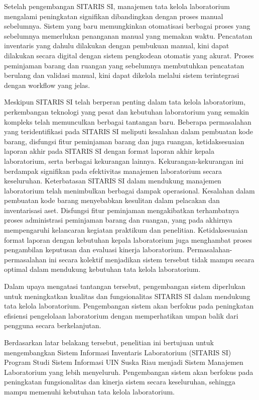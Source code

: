 Setelah pengembangan SITARIS SI, manajemen tata kelola laboratorium mengalami peningkatan signifikan dibandingkan dengan proses manual sebelumnya. Sistem yang baru memungkinkan otomatisasi berbagai proses yang sebelumnya memerlukan penanganan manual yang memakan waktu. Pencatatan inventaris yang dahulu dilakukan dengan pembukuan manual, kini dapat dilakukan secara digital dengan sistem pengkodean otomatis yang akurat. Proses peminjaman barang dan ruangan yang sebelumnya membutuhkan pencatatan berulang dan validasi manual, kini dapat dikelola melalui sistem terintegrasi dengan workflow yang jelas.

Meskipun SITARIS SI telah berperan penting dalam tata kelola laboratorium, perkembangan teknologi yang pesat dan kebutuhan laboratorium yang semakin kompleks telah memunculkan berbagai tantangan baru. Beberapa permasalahan yang teridentifikasi pada SITARIS SI meliputi kesalahan dalam pembuatan kode barang, disfungsi fitur peminjaman barang dan juga ruangan, ketidaksesuaian laporan akhir pada SITARIS SI dengan format laporan akhir kepala laboratorium, serta berbagai kekurangan lainnya. Kekurangan-kekurangan ini berdampak signifikan pada efektivitas manajemen laboratorium secara keseluruhan. Keterbatasan SITARIS SI dalam mendukung manajemen laboratorium telah menimbulkan berbagai dampak operasional. Kesalahan dalam pembuatan kode barang menyebabkan kesulitan dalam pelacakan dan inventarisasi aset. Disfungsi fitur peminjaman mengakibatkan terhambatnya proses administrasi peminjaman barang dan ruangan, yang pada akhirnya mempengaruhi kelancaran kegiatan praktikum dan penelitian. Ketidaksesuaian format laporan dengan kebutuhan kepala laboratorium juga menghambat proses pengambilan keputusan dan evaluasi kinerja laboratorium. Permasalahan-permasalahan ini secara kolektif menjadikan sistem tersebut tidak mampu secara optimal dalam mendukung kebutuhan tata kelola laboratorium.

Dalam upaya mengatasi tantangan tersebut, pengembangan sistem diperlukan untuk meningkatkan kualitas dan fungsionalitas SITARIS SI dalam mendukung tata kelola laboratorium. Pengembangan sistem akan berfokus pada peningkatan efisiensi pengelolaan laboratorium dengan memperhatikan umpan balik dari pengguna secara berkelanjutan.

Berdasarkan latar belakang tersebut, penelitian ini bertujuan untuk mengembangkan Sistem Informasi Inventaris Laboratorium (SITARIS SI) Program Studi Sistem Informasi UIN Suska Riau menjadi Sistem Manajemen Laboratorium yang lebih menyeluruh. Pengembangan sistem akan berfokus pada peningkatan fungsionalitas dan kinerja sistem secara keseluruhan, sehingga mampu memenuhi kebutuhan tata kelola laboratorium.

